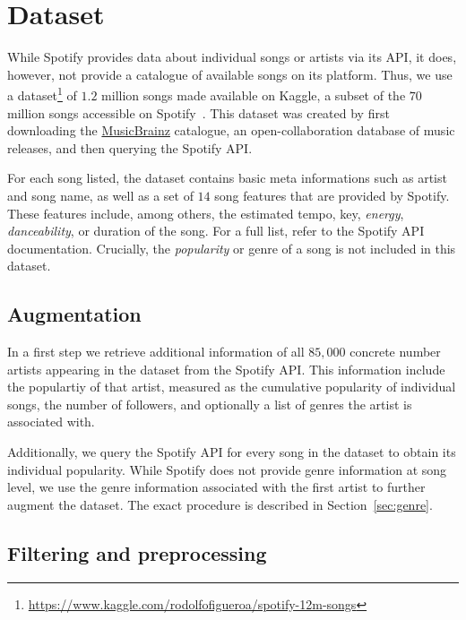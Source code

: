 \documentclass{article}
\newcommand{\todo}[1]{{\color{red} #1}}
\begin{document}
\section{Dataset}

While Spotify provides data about individual songs or artists via its API, it does, however, not provide a catalogue of available songs on its platform. Thus, we use a dataset\footnote{\url{https://www.kaggle.com/rodolfofigueroa/spotify-12m-songs}} of $1.2$ million songs made available on Kaggle, a subset of the $70$ million songs accessible on Spotify~\cite{ingham_2020}. This dataset was created by first downloading the \href{https://musicbrainz.org/}{MusicBrainz} catalogue, an open-collaboration database of music releases, and then querying the Spotify API. 

For each song listed, the dataset contains basic meta informations such as artist and song name, as well as a set of $14$ song features that are provided by Spotify. These features include, among others, the estimated tempo, key, \emph{energy}, \emph{danceability}, or duration of the song. For a full list, refer to the Spotify API documentation. Crucially, the \emph{popularity} or genre of a song is not included in this dataset.

\subsection{Augmentation}
In a first step we retrieve additional information of all $85,000$\todo{concrete number} artists appearing in the dataset from the Spotify API. This information include the populartiy of that artist, measured as the cumulative popularity of individual songs, the number of followers, and optionally a list of genres the artist is associated with.

Additionally, we query the Spotify API for every song in the dataset to obtain its individual popularity. While Spotify does not provide genre information at song level, we use the genre information associated with the first artist to further augment the dataset. The exact procedure is described in Section~\ref{sec:genre}. 

\subsection{Filtering and preprocessing}
\end{document}
